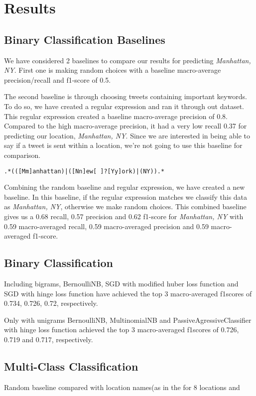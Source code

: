 \documentclass[twoside,11pt]{article}
\begin{document}
\section{Results}

\subsection{Binary Classification Baselines}
We have considered 2 baselines to compare our results for predicting \textit{Manhattan, NY}. First one is making random choices with a baseline macro-average precision/recall and f1-score of 0.5.

The second baseline is through choosing tweets containing important keywords. To do so, we have created a regular expression and ran it through out dataset. This regular expression created a baseline macro-average precision of 0.8. Compared to the high macro-average precision, it had a very low recall 0.37 for predicting our location, \textit{Manhattan, NY}. Since we are interested in being able to say if a tweet is sent within a location, we're not going to use this baseline for comparison.

\begin{verbatim}
.*(([Mm]anhattan)|([Nn]ew[ ]?[Yy]ork)|(NY)).*
\end{verbatim} 


Combining the random baseline and regular expression, we have created a new baseline. In this baseline, if the regular expression matches we classify this data as \textit{Manhattan, NY}, otherwise we make random choices. This combined baseline gives us a 0.68 recall, 0.57 precision and 0.62 f1-score for \textit{Manhattan, NY} with 0.59 macro-averaged recall, 0.59 macro-averaged precision and 0.59 macro-averaged f1-score. 

\subsection{Binary Classification}

Including bigrams, BernoulliNB, SGD with modified huber loss function and SGD with hinge loss function have achieved the top 3 macro-averaged f1scores of 0.734, 0.726, 0.72, respectively. 

Only with unigrams BernoulliNB, MultinomialNB and PassiveAgressiveClassifier with hinge loss function achieved the top 3 macro-averaged f1scores of 0.726, 0.719 and 0.717, respectively. 

\subsection{Multi-Class Classification}
Random baseline compared with location names(as in the for 8 locations and
\end{document}
